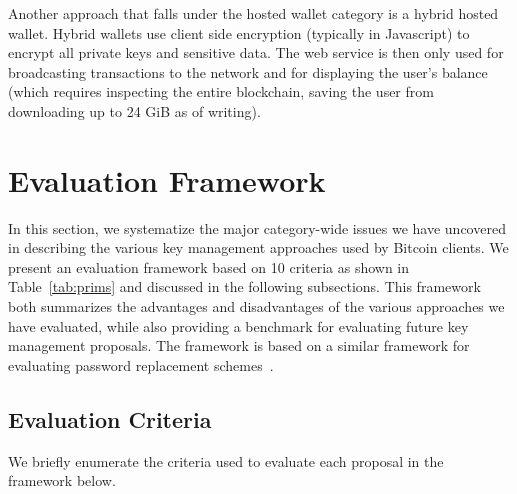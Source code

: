 Another approach that falls under the hosted wallet category is a hybrid hosted wallet. Hybrid wallets use client side encryption (typically in Javascript) to encrypt all private keys and sensitive data. The web service is then only used for broadcasting transactions to the network and for displaying the user's balance (which requires inspecting the entire blockchain, saving the user from downloading up to 24 GiB as of writing). 




\section{Evaluation Framework}
In this section, we systematize the major category-wide issues we have uncovered in describing the various key management approaches used by Bitcoin clients. We present an evaluation framework based on 10 criteria as shown in Table~\ref{tab:prims} and discussed in the following subsections. This framework both summarizes the advantages and disadvantages of the various approaches we have evaluated, while also providing a benchmark for evaluating future key management proposals. The framework is based on a similar framework for evaluating password replacement schemes~\cite{BHOS12}.

\subsection{Evaluation Criteria}
We briefly enumerate the criteria used to evaluate each proposal in the framework below. 

